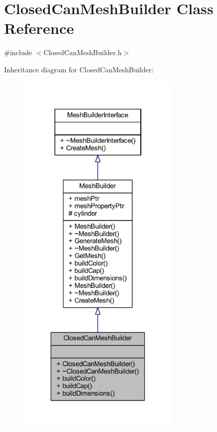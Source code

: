 \hypertarget{class_closed_can_mesh_builder}{}\section{Closed\+Can\+Mesh\+Builder Class Reference}
\label{class_closed_can_mesh_builder}


{\ttfamily \#include $<$Closed\+Can\+Mesh\+Builder.\+h$>$}



Inheritance diagram for Closed\+Can\+Mesh\+Builder\+:
\nopagebreak
\begin{figure}[H]
\begin{center}
\leavevmode
\includegraphics[width=219pt]{class_closed_can_mesh_builder__inherit__graph}
\end{center}
\end{figure}


